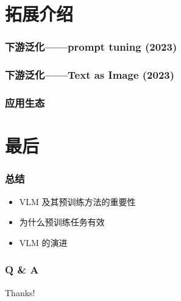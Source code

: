 \documentclass{beamer}
\makeatletter
\newenvironment{litemize-p}{%
  \par\begingroup
  \def\beamer@setuplines{\baselineskip=12pt\relax}%
  \usebeamerfont{itemize item}%
  \large\linespread{1.25}\selectfont
  \begin{itemize}[]
}{%
  \end{itemize}%
  \endgroup
}
\makeatother
\begin{document}
\section{拓展介绍}
\begin{frame}
    \frametitle{下游泛化——prompt tuning (2023)}
\end{frame}
\begin{frame}
    \frametitle{下游泛化——Text as Image (2023)}
\end{frame}
\begin{frame}
    \frametitle{应用生态}
\end{frame}

\section{最后}
\begin{frame}
    \frametitle{总结}
    \begin{itemize}
        \item VLM 及其预训练方法的重要性
        \item 为什么预训练任务有效
        \item VLM 的演进
    \end{itemize}
\end{frame}

\begin{frame}
    \frametitle{Q \& A}
\end{frame}

\begin{frame}
    \begin{center}
        {\Huge\calligra Thanks!}
    \end{center}
\end{frame}
\end{document}
